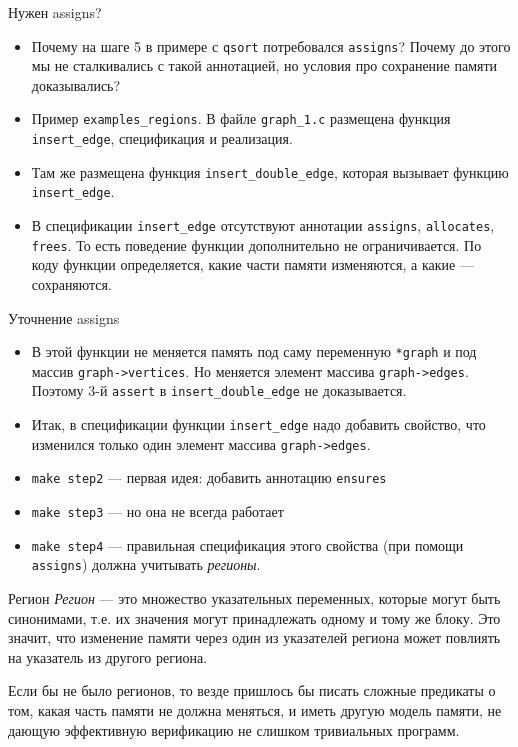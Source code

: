 \documentclass[hyperref={unicode=true}]{beamer}
\begin{document}
    \begin{frame}{Нужен assigns?}
    \begin{itemize}
    \item Почему на шаге 5 в примере с \texttt{qsort} потребовался \texttt{assigns}? Почему до этого мы не сталкивались с такой аннотацией,
    но условия про сохранение памяти доказывались?
    \item Пример \texttt{examples\_regions}. В файле \texttt{graph\_1.c} размещена функция \texttt{insert\_edge}, спецификация и реализация.
    \item Там же размещена функция \texttt{insert\_double\_edge}, которая вызывает функцию \texttt{insert\_edge}.
    \item В спецификации \texttt{insert\_edge} отсутствуют аннотации \texttt{assigns}, \texttt{allocates}, \texttt{frees}. То есть поведение
    функции дополнительно не ограничивается. По коду функции определяется, какие части памяти изменяются, а какие --- сохраняются.
    \end{itemize}
    \end{frame}

    \begin{frame}{Уточнение assigns}
    \begin{itemize}
    \item В этой
    функции не меняется память под саму переменную \texttt{*graph} и под массив \texttt{graph->vertices}. Но меняется элемент массива
    \texttt{graph->edges}. Поэтому 3-й \texttt{assert} в \texttt{insert\_double\_edge} не доказывается.
    \item Итак, в спецификации функции \texttt{insert\_edge} надо добавить свойство, что изменился только один элемент массива \texttt{graph->edges}.
    \item \texttt{make step2} --- первая идея: добавить аннотацию \texttt{ensures}
    \item \texttt{make step3} --- но она не всегда работает
    \item \texttt{make step4} --- правильная спецификация этого свойства (при помощи \texttt{assigns}) должна учитывать \emph{регионы}.
    \end{itemize}
    \end{frame}

    \begin{frame}{Регион}
    \emph{Регион} --- это множество указательных переменных, которые могут быть синонимами, т.е. их значения могут
    принадлежать одному и тому же блоку. Это значит, что изменение памяти через один из указателей региона может повлиять на указатель из другого региона.

    Если бы не было регионов, то везде пришлось бы писать сложные предикаты о том, какая часть памяти не должна меняться, и иметь другую модель памяти, не
    дающую эффективную верификацию не слишком тривиальных программ.
    \end{frame}
\end{document}
